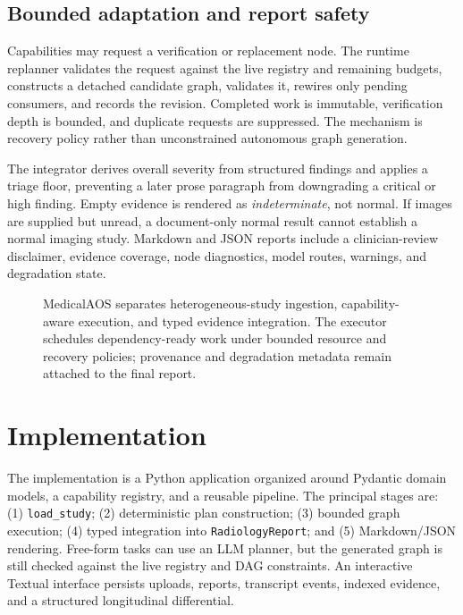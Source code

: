 \documentclass[a4paper,conference]{IEEEtran}
\begin{document}
\subsection{Bounded adaptation and report safety}
Capabilities may request a verification or replacement node. The runtime replanner validates the request against the live registry and remaining budgets, constructs a detached candidate graph, validates it, rewires only pending consumers, and records the revision. Completed work is immutable, verification depth is bounded, and duplicate requests are suppressed. The mechanism is recovery policy rather than unconstrained autonomous graph generation.

The integrator derives overall severity from structured findings and applies a triage floor, preventing a later prose paragraph from downgrading a critical or high finding. Empty evidence is rendered as \textit{indeterminate}, not normal. If images are supplied but unread, a document-only normal result cannot establish a normal imaging study. Markdown and JSON reports include a clinician-review disclaimer, evidence coverage, node diagnostics, model routes, warnings, and degradation state.

\begin{figure}[t]
\centering
{}
\caption{MedicalAOS separates heterogeneous-study ingestion, capability-aware execution, and typed evidence integration. The executor schedules dependency-ready work under bounded resource and recovery policies; provenance and degradation metadata remain attached to the final report.}
\label{fig:architecture}
\end{figure}

\section{Implementation}
The implementation is a Python application organized around Pydantic domain models, a capability registry, and a reusable pipeline. The principal stages are: (1) \texttt{load\_study}; (2) deterministic plan construction; (3) bounded graph execution; (4) typed integration into \texttt{RadiologyReport}; and (5) Markdown/JSON rendering. Free-form tasks can use an LLM planner, but the generated graph is still checked against the live registry and DAG constraints. An interactive Textual interface persists uploads, reports, transcript events, indexed evidence, and a structured longitudinal differential.
\end{document}
